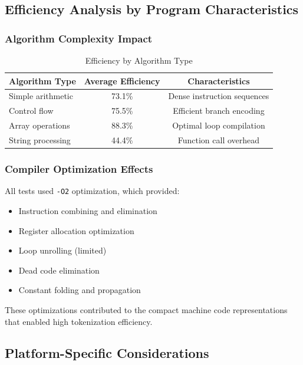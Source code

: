 \documentclass[11pt,a4paper]{article}
\begin{document}
\subsection{Efficiency Analysis by Program Characteristics}

\subsubsection{Algorithm Complexity Impact}
\begin{table}[H]
\centering
\caption{Efficiency by Algorithm Type}
\begin{tabular}{lcc}
\toprule
\textbf{Algorithm Type} & \textbf{Average Efficiency} & \textbf{Characteristics}\\
\midrule
Simple arithmetic & 73.1\% & Dense instruction sequences\\
Control flow & 75.5\% & Efficient branch encoding\\
Array operations & 88.3\% & Optimal loop compilation\\
String processing & 44.4\% & Function call overhead\\
\bottomrule
\end{tabular}
\end{table}

\subsubsection{Compiler Optimization Effects}
All tests used \texttt{-O2} optimization, which provided:
\begin{itemize}
    \item Instruction combining and elimination
    \item Register allocation optimization  
    \item Loop unrolling (limited)
    \item Dead code elimination
    \item Constant folding and propagation
\end{itemize}

These optimizations contributed to the compact machine code representations that enabled high tokenization efficiency.

\subsection{Platform-Specific Considerations}
\end{document}
